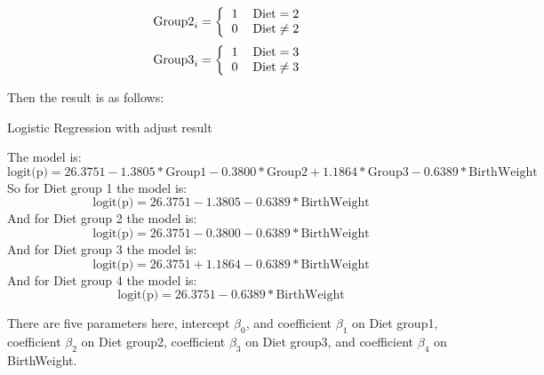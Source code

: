 \documentclass[10pt,letterpaper]{article}
\begin{document}
\begin{enumerate}[leftmargin=0cm,itemindent=.5cm,labelwidth=\itemindent,labelsep=0cm,align=left]
\begin{multicols}{2}
\[\text{Group2}_i=  
\left \{
  \begin{tabular}{cc}
  1 &  $\text{Diet}= 2$\\
  0 &  $\text{Diet} \neq 2$\\
  \end{tabular}
\right.
\]
\[\text{Group3}_i=  
\left \{
  \begin{tabular}{cc}
  1 &  $\text{Diet}= 3$\\
  0 &  $\text{Diet} \neq 3$\\
  \end{tabular}
\right.
\]
\end{multicols}

Then the result is as follows:
\begin{center}
Logistic Regression with adjust result

\end{center}
The model is:
\[\text{logit(p)} = 26.3751-1.3805*\text{Group1}-0.3800*\text{Group2}+1.1864*\text{Group3}-0.6389*\text{BirthWeight}\]
So for Diet group 1 the model is:
\[\text{logit(p)} = 26.3751-1.3805-0.6389*\text{BirthWeight}\]
And for Diet group 2 the model is:
\[\text{logit(p)} = 26.3751-0.3800-0.6389*\text{BirthWeight}\]
And for Diet group 3 the model is:
\[\text{logit(p)} = 26.3751+1.1864-0.6389*\text{BirthWeight}\]
And for Diet group 4 the model is:
\[\text{logit(p)} = 26.3751-0.6389*\text{BirthWeight}\]

There are five parameters here, intercept $\beta_0$, and coefficient $\beta_1$ on Diet group1,  coefficient $\beta_2$ on Diet group2, coefficient $\beta_3$ on Diet group3, and coefficient $\beta_4$ on BirthWeight.


\end{enumerate}
\end{document}
